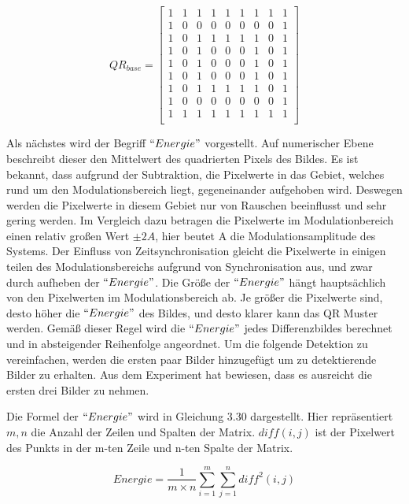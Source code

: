 \begin{equation}
QR_{base} = \begin{bmatrix}
    1 &1 &1 &1 &1 &1 &1 &1 &1 \\
    1 &0 &0 &0 &0 &0 &0 &0 &1 \\
    1 &0 &1 &1 &1 &1 &1 &0 &1 \\ 
    1 &0 &1 &0 &0 &0 &1 &0 &1 \\ 
    1 &0 &1 &0 &0 &0 &1 &0 &1 \\ 
    1 &0 &1 &0 &0 &0 &1 &0 &1 \\ 
    1 &0 &1 &1 &1 &1 &1 &0 &1 \\ 
    1 &0 &0 &0 &0 &0 &0 &0 &1 \\ 
    1 &1 &1 &1 &1 &1 &1 &1 &1 \\ 
\end{bmatrix}
\end{equation}

Als nächstes wird der Begriff $``Energie"$ vorgestellt. Auf numerischer Ebene beschreibt dieser den Mittelwert des quadrierten Pixels des Bildes. Es ist bekannt, dass aufgrund der Subtraktion, die Pixelwerte in das Gebiet, welches rund um den Modulationsbereich liegt, gegeneinander aufgehoben wird. Deswegen werden die Pixelwerte in diesem Gebiet nur von Rauschen beeinflusst und sehr gering werden. Im Vergleich dazu betragen die Pixelwerte im Modulationbereich einen relativ großen Wert $\pm2A$, hier beutet A die Modulationsamplitude des Systems. Der Einfluss von Zeitsynchronisation gleicht die Pixelwerte in einigen teilen des Modulationsbereichs aufgrund von Synchronisation aus, und zwar durch aufheben der $ ``Energie" $. Die Größe der $``Energie"$ hängt hauptsächlich von den Pixelwerten im Modulationsbereich ab. Je größer die Pixelwerte sind, desto höher die $``Energie"$ des Bildes, und desto klarer kann das QR Muster werden. Gemäß dieser Regel wird die $``Energie"$ jedes Differenzbildes berechnet und in absteigender Reihenfolge angeordnet. Um die folgende Detektion zu vereinfachen, werden die ersten paar Bilder hinzugefügt um zu detektierende Bilder zu erhalten. Aus dem Experiment hat bewiesen, dass es ausreicht die ersten drei Bilder zu nehmen.

Die Formel der $``Energie"$ wird in Gleichung 3.30 dargestellt. Hier repräsentiert $ m,n $ die Anzahl der Zeilen und Spalten der Matrix. $diff(i,j)$ ist der Pixelwert des Punkts in der m-ten Zeile und n-ten Spalte der Matrix.

\begin{equation}
Energie = \frac{1}{m \times n} \sum_{i=1}^m \sum_{j=1}^n diff^2(i,j) 
\end{equation}

